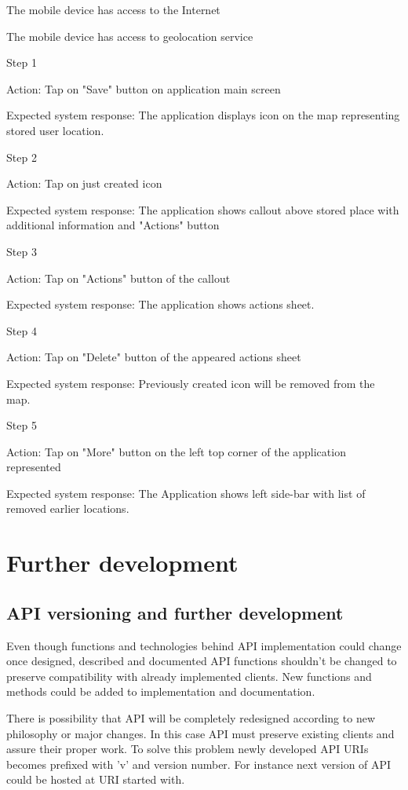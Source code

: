 \documentclass[thesis=M,english]{FITthesis}[2012/10/20]
\begin{document}
The mobile device has access to the Internet

The mobile device has access to geolocation service

Step 1

Action: Tap on "Save" button on application main screen

Expected system response: The application displays icon on the map representing stored user location.

Step 2

Action: Tap on just created icon

Expected system response: The application shows callout above stored place with additional information and "Actions" button

Step 3

Action: Tap on "Actions" button of the callout

Expected system response: The application shows actions sheet.

Step 4

Action: Tap on "Delete" button of the appeared actions sheet 

Expected system response: Previously created icon will be removed from the map.

Step 5

Action: Tap on "More" button on the left top corner of the application represented 

Expected system response: The Application shows left side-bar with list of removed earlier locations.



\chapter{Further development}

\section{API versioning and further development} 

Even though functions and technologies behind API implementation could change once designed, described and documented API functions shouldn't be changed to preserve compatibility with already implemented clients. New functions and methods could be added to implementation and documentation. 

There is possibility that API will be completely redesigned according to new philosophy or major changes. In this case API must preserve existing clients and assure their proper work. To solve this problem newly developed API URIs becomes prefixed with 'v' and version number. For instance next version of API could be hosted at URI started with.
\end{document}
